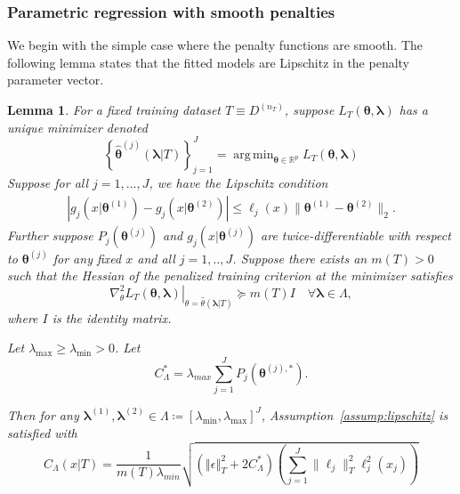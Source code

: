 \documentclass[12pt]{article} %
\newtheorem{lemma}{Lemma}
\theoremstyle{definition}
\DeclareMathOperator*{\argmin}{arg\,min}
\begin{document}
\subsubsection{Parametric regression with smooth penalties}
\label{sec:param_smooth}
We begin with the simple case where the penalty functions are smooth. The following lemma states that the fitted models are Lipschitz in the penalty parameter vector.
\begin{lemma}
	\label{lemma:param_add}
	For a fixed training dataset $T \equiv D^{(n_T)}$, suppose $L_T \left (\boldsymbol{\theta}, \boldsymbol{\lambda} \right)$ has a unique minimizer denoted
	\begin{equation}
	\label{eq:param_add_estimator}
	\left\{
	\hat{\boldsymbol{\theta}}^{(j)}\left (\boldsymbol{\lambda} | T \right )
	\right\}_{j=1}^J =
	\argmin_{\boldsymbol{\theta} \in \mathbb{R}^p} L_T \left (\boldsymbol{\theta}, \boldsymbol{\lambda} \right)
	\end{equation}
	Suppose for all $j = 1,...,J$, we have the Lipschitz condition
	\begin{align}
	\left|
	g_j\left(x|\boldsymbol{\theta}^{(1)}\right)
	-g_j\left(x|\boldsymbol{\theta}^{(2)}\right)
	\right|
	\le
	\ell_j (x)
	\|\boldsymbol{\theta}^{(1)}-\boldsymbol{\theta}^{(2)}\|_{2}.
	\end{align}
	Further suppose $P_j(\boldsymbol{\theta}^{(j)})$ and $g_j(x | \boldsymbol{\theta}^{(j)})$ are twice-differentiable with respect to $\boldsymbol{\theta}^{(j)}$ for any fixed $x$ and all $j=1,..,J$.
	Suppose there exists an $m(T) > 0$ such that the Hessian of the penalized training criterion at the minimizer satisfies
	\begin{equation}
	\left . \nabla_{\theta}^2 L_T \left (\boldsymbol{\theta}, \boldsymbol{\lambda} \right) \right |_{\theta = \hat{\theta}(\boldsymbol{\lambda} | T )} \succeq m(T) I \quad \forall \boldsymbol{\lambda} \in \Lambda,
	\label{eq:smooth_pos_def}
	\end{equation}
	where $I$ is the identity matrix.
	
	\noindent
	Let $\lambda_{\max} \ge \lambda_{\min} > 0$. Let
	\begin{equation}
	C^*_{\Lambda} = \lambda_{max}\sum_{j=1}^{J} P_{j}(\boldsymbol{\theta}^{(j),*}).
	\end{equation}
	
	\noindent
	Then for any $\boldsymbol{\lambda}^{(1)}, \boldsymbol{\lambda}^{(2)} \in \Lambda \coloneqq \left [ \lambda_{\min}, \lambda_{\max} \right ]^J$,
	Assumption~\ref{assump:lipschitz} is satisfied with
	\begin{equation}
	\label{eq:param_add_lipschitz}
	C_\Lambda(x | T) =
	\frac{1}{m(T) \lambda_{min}}
	\sqrt{
		\left(
		\left\Vert \epsilon \right \Vert_T^2 + 2 C^*_{\Lambda}
		\right)
		\left(
		\sum_{j=1}^J  \|\ell_j\|_T^2 \ell_j^2(x_j)
		\right)
	}
	\end{equation}
\end{lemma}
\end{document}
